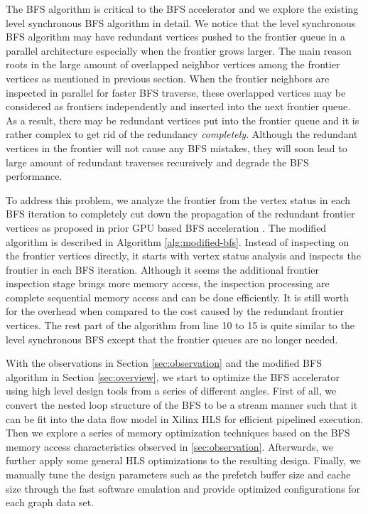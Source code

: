 The BFS algorithm is critical to the BFS accelerator and we explore the 
existing level synchronous BFS algorithm in detail. We notice that 
the level synchronous BFS algorithm may have redundant vertices pushed to the 
frontier queue in a parallel architecture especially when the frontier grows larger.
The main reason roots in the large amount of overlapped neighbor vertices among the 
frontier vertices as mentioned in previous section. When the frontier neighbors 
are inspected in parallel for faster BFS traverse, these overlapped vertices may be 
considered as frontiers independently and inserted into the next frontier queue. 
As a result, there may be redundant vertices put into the frontier queue and it is 
rather complex to get rid of the redundancy \textit{completely}. Although the redundant 
vertices in the frontier will not cause any BFS mistakes, they will soon lead to large 
amount of redundant traverses recursively and degrade the BFS performance.

To address this problem, we analyze the frontier from the 
vertex status in each BFS iteration to completely cut down the 
propagation of the redundant frontier vertices as proposed in prior 
GPU based BFS acceleration \cite{liu2015enterprise}. The modified algorithm is described 
in Algorithm \ref{alg:modified-bfs}. Instead of inspecting on the frontier vertices directly, 
it starts with vertex status analysis and inspects the frontier 
in each BFS iteration. Although it seems the additional frontier inspection stage 
brings more memory access, the inspection processing are complete sequential 
memory access and can be done efficiently. It is still worth for the overhead 
when compared to the cost caused by the redundant frontier vertices. 
The rest part of the algorithm from line 10 to 15 is 
quite similar to the level synchronous BFS except that the frontier queues 
are no longer needed.


With the observations in Section \ref{sec:observation} 
and the modified BFS algorithm in Section \ref{sec:overview}, 
we start to optimize the BFS accelerator using high level design tools 
from a series of different angles. First of all, we convert the nested loop structure 
of the BFS to be a stream manner such that it can be fit into the data flow model in
Xilinx HLS for efficient pipelined execution. Then we explore a series of memory optimization 
techniques based on the BFS memory access characteristics observed in \ref{sec:observation}. 
Afterwards, we further apply some general HLS optimizations to the resulting design. Finally, 
we manually tune the design parameters such as the prefetch buffer size and cache size through 
the fast software emulation and provide optimized configurations for each graph data set.

